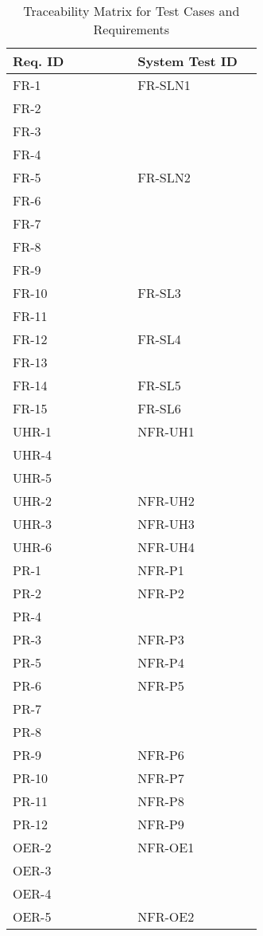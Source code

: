 \documentclass[12pt, titlepage]{article}
\begin{document}
\begin{longtable}{|p{0.45\linewidth}|p{0.45\linewidth}|} \caption{Traceability
  Matrix for Test Cases and Requirements} \label{table:traceability}\\
  \hline
  \textbf{Req. ID} & \textbf{System Test ID} \\
  \hline
  FR-1 & FR-SLN1\\
  FR-2 & \\
  FR-3 & \\
  FR-4 & \\
  \hline
  FR-5 & FR-SLN2\\
  FR-6 & \\
  FR-7 & \\
  FR-8 & \\
  FR-9 & \\
  \hline
  FR-10 & FR-SL3\\
  FR-11 & \\
  \hline
  FR-12 & FR-SL4\\
  FR-13 & \\
  \hline
  FR-14 & FR-SL5\\
  \hline
  FR-15 & FR-SL6\\
  \hline
  UHR-1 & NFR-UH1\\
  UHR-4 & \\
  UHR-5 & \\
  \hline
  UHR-2 & NFR-UH2\\
  \hline
  UHR-3 & NFR-UH3\\
  \hline
  UHR-6 & NFR-UH4\\
  \hline
  PR-1 & NFR-P1\\
  \hline
  PR-2 & NFR-P2\\
  PR-4 & \\
  \hline
  PR-3 & NFR-P3\\
  \hline
  PR-5 & NFR-P4\\
  \hline
  PR-6 & NFR-P5\\
  PR-7 & \\
  PR-8 & \\
  \hline
  PR-9 & NFR-P6\\
  \hline
  PR-10 & NFR-P7\\
  \hline
  PR-11 & NFR-P8\\
  \hline
  PR-12 & NFR-P9\\
  \hline
  OER-2 & NFR-OE1\\
  OER-3 & \\
  OER-4 & \\
  \hline
  OER-5 & NFR-OE2\\
  \hline

\end{longtable}
\end{document}
